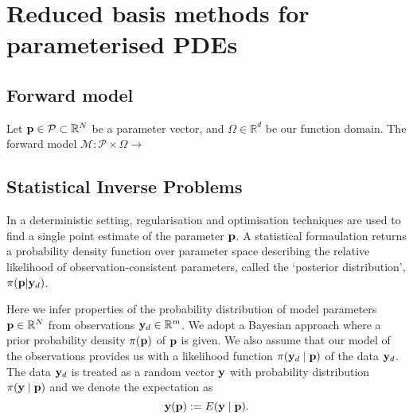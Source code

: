 


\chapter{Reduced basis methods for parameterised PDEs}


\section{Forward model}
Let ${\mathbf{p}} \in \mathcal{P} \subset \mathbb{R}^N$ be a parameter vector, and $\Omega \in \mathbb{R}^d$ be our function domain. The forward model $\mathcal{M}: \mathcal{P}\times \Omega \rightarrow $

\section{Statistical Inverse Problems}
In a deterministic setting, regularisation and optimisation techniques are used to find a single point estimate of the parameter ${\mathbf{p}}$. A statistical formaulation returns a probability density function over parameter space describing the relative likelihood of observation-consistent parameters, called the `posterior distribution', $\pi({\mathbf{p}}| {\mathbf{y}}_d)$.

Here we infer properties of the probability distribution of model parameters ${\mathbf{p}}\in{\mathbb R}^N$ 
from observations ${\mathbf{y}}_d\in{\mathbb R}^m$. 
We adopt a Bayesian approach where a prior probability density $\pi({\mathbf{p}})$ of ${\mathbf{p}}$ is given. 
We also assume that our model of the observations provides us with
a likelihood function $\pi({\mathbf{y}}_d\mid {\mathbf{p}})$ of the data ${\mathbf{y}}_d$. 
The data ${\mathbf{y}}_d$ is treated as a random vector ${\mathbf{y}}$ with probability distribution $\pi({\mathbf{y}}\mid {\mathbf{p}})$ and we denote the expectation as
\begin{equation*}
{\mathbf{y}}({\mathbf{p}}) := E({\mathbf{y}}\mid {\mathbf{p}}).
\end{equation*}

